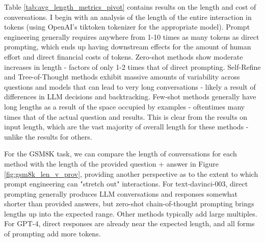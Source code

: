 \documentclass[11pt]{article}
\begin{document}

Table \ref{tab:avg_length_metrics_pivot} contains results on the length and cost of conversations. I begin with an analysis of the length of the entire interaction in tokens (using OpenAI's tiktoken tokenizer for the appropriate model). Prompt engineering generally requires anywhere from 1-10 times as many tokens as direct prompting, which ends up having downstream effects for the amount of human effort and direct financial costs of tokens. Zero-shot methods show moderate increases in length - factors of only 1-2 times that of direct prompting. Self-Refine and Tree-of-Thought methods exhibit massive amounts of variability across questions and models that can lead to very long conversations - likely a result of differences in LLM decisions and backtracking. Few-shot methods generally have long lengths as a result of the space occupied by examples - oftentimes many times that of the actual question and results. This is clear from the results on input length, which are the vast majority of overall length for these methods - unlike the results for others.

For the GSM8K task, we can compare the length of conversations for each method with the length of the provided question + answer in Figure \ref{fig:gsm8k_len_v_prov}, providing another perspective as to the extent to which prompt engineering can "stretch out" interactions. For text-davinci-003, direct prompting generally produces LLM conversations and responses somewhat shorter than provided answers, but zero-shot chain-of-thought prompting brings lengths up into the expected range. Other methods typically add large multiples. For GPT-4, direct responses are already near the expected length, and all forms of prompting add more tokens.
\end{document}
